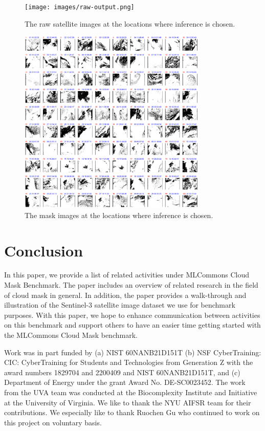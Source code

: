 \documentclass[sigplan,screen]{acmart}
\begin{document}
\begin{figure}[htb]
\centering\texttt{[image: images/raw-output.png]}
\caption{The raw satellite images at the locations where inference is chosen.}
\label{fig:frames-raw}
\end{figure}

\begin{figure}[htb]
\centering\includegraphics[width=0.8\textwidth]{images/masks-output.png}
\caption{The mask images at the locations where inference is chosen.}
\label{fig:frames-mask}
\end{figure}



\section{Conclusion}


In this paper, we provide a list of related activities under MLCommons Cloud Mask Benchmark. The paper includes an overview of related research in the field of cloud mask in general. In addition, the paper provides a walk-through and illustration of the Sentinel-3 satellite image dataset we use for benchmark purposes. With this paper, we hope to enhance communication between activities on this benchmark and support others to have an easier time getting started with the MLCommons Cloud Mask benchmark.

\begin{acks}

Work was in part funded by (a) NIST 60NANB21D151T  (b) NSF CyberTraining: CIC: CyberTraining for Students and Technologies from Generation Z with the award numbers 1829704 and 2200409 and NIST 60NANB21D151T, and (c) Department of Energy under the grant Award No. DE-SC0023452. The work from the UVA team was conducted at the Biocomplexity Institute and Initiative at the University of Virginia.
We like to thank the NYU AIFSR team for their contributions. We especially like to thank Ruochen Gu who continued to work on this project on voluntary basis.


\end{acks}
\end{document}
